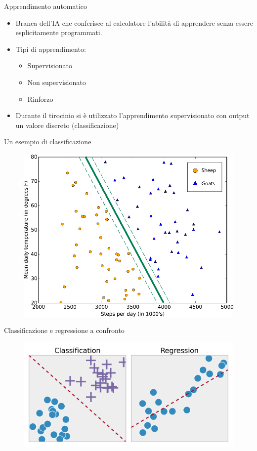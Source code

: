 \documentclass[11pt]{beamer}
\begin{document}
	\begin{frame}{Apprendimento automatico}
		\begin{itemize}
		\item Branca dell'IA che conferisce al calcolatore l'abilit\`a di apprendere senza essere esplicitamente programmati.
		\item Tipi di apprendimento:
			\begin{itemize}
				\item Supervisionato
				\item Non supervisionato
				\item Rinforzo
			\end{itemize}
		\item Durante il tirocinio si \`e utilizzato l'apprendimento supervisionato con output un valore discreto (classificazione)
		\end{itemize}
	\end{frame}
	\begin{frame}{Un esempio di classificazione}
		\begin{figure}
			\centering
			\includegraphics[width=0.7\linewidth]{img/supervised_learning_example}
		\end{figure}
	\end{frame}
	\begin{frame}{Classificazione e regressione a confronto}
		\begin{figure}
			\centering
			\includegraphics[width=0.7\linewidth]{img/Classification_Regression}
		\end{figure}	
	\end{frame}
\end{document}
